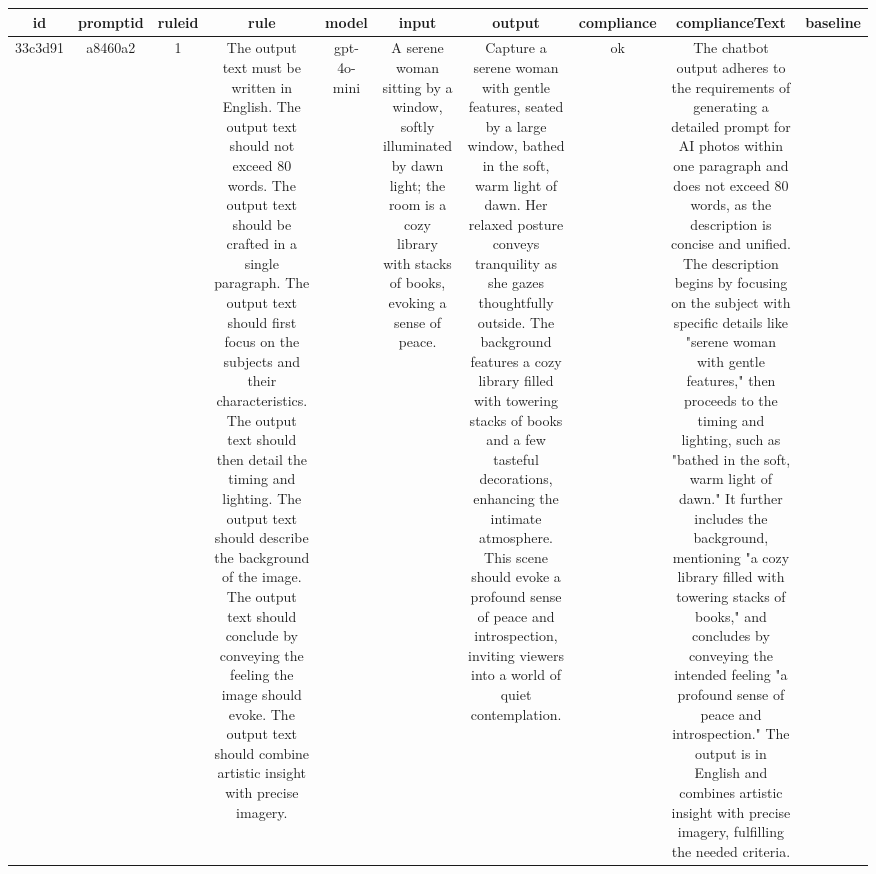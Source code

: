 
  \begin{table}[h!]
  \centering
  \begin{tabular}{|c|c|c|c|c|c|c|c|c|c|}
  \hline
  id & promptid & ruleid & rule & model & input & output & compliance & complianceText & baseline \\
  \hline
  33c3d91 & a8460a2 & 1 & The output text must be written in English. The output text should not exceed 80 words. The output text should be crafted in a single paragraph. The output text should first focus on the subjects and their characteristics. The output text should then detail the timing and lighting. The output text should describe the background of the image. The output text should conclude by conveying the feeling the image should evoke. The output text should combine artistic insight with precise imagery. & gpt-4o-mini & A serene woman sitting by a window, softly illuminated by dawn light; the room is a cozy library with stacks of books, evoking a sense of peace. & Capture a serene woman with gentle features, seated by a large window, bathed in the soft, warm light of dawn. Her relaxed posture conveys tranquility as she gazes thoughtfully outside. The background features a cozy library filled with towering stacks of books and a few tasteful decorations, enhancing the intimate atmosphere. This scene should evoke a profound sense of peace and introspection, inviting viewers into a world of quiet contemplation. & ok & The chatbot output adheres to the requirements of generating a detailed prompt for AI photos within one paragraph and does not exceed 80 words, as the description is concise and unified. The description begins by focusing on the subject with specific details like "serene woman with gentle features," then proceeds to the timing and lighting, such as "bathed in the soft, warm light of dawn." It further includes the background, mentioning "a cozy library filled with towering stacks of books," and concludes by conveying the intended feeling "a profound sense of peace and introspection." The output is in English and combines artistic insight with precise imagery, fulfilling the needed criteria.


\end{tabular}
\end{table}
